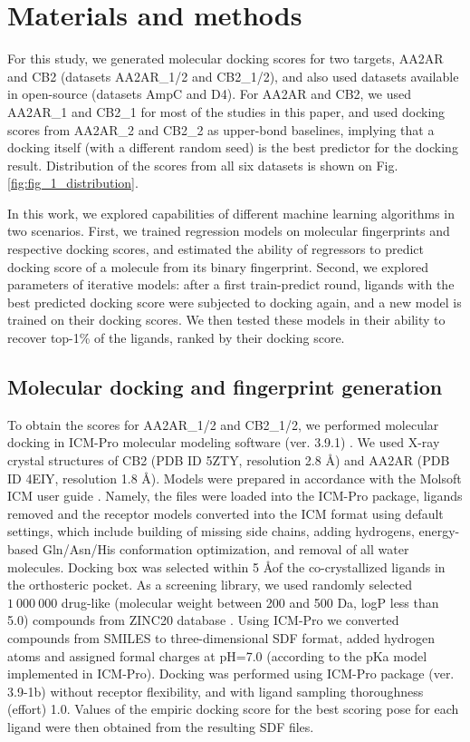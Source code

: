 \section{Materials and methods}
For this study, we generated molecular docking scores for two targets, AA2AR and CB2 (datasets AA2AR\_1/2 and CB2\_1/2), and also used datasets available in open-source \cite{ultralarge_docking_first} (datasets AmpC and D4). For AA2AR and CB2, we used AA2AR\_1 and CB2\_1 for most of the studies in this paper, and used docking scores from AA2AR\_2 and CB2\_2 as upper-bond baselines, implying that a docking itself (with a different random seed) is the best predictor for the docking result. Distribution of the scores from all six datasets is shown on Fig. \ref{fig:fig_1_distribution}.

In this work, we explored capabilities of different machine learning algorithms in two scenarios. First, we trained regression models on molecular fingerprints and respective docking scores, and estimated the ability of regressors to predict docking score of a molecule from its binary fingerprint. Second, we explored parameters of iterative models: after a first train-predict round, ligands with the best predicted docking score were subjected to docking again, and a new model is trained on their docking scores. We then tested these models in their ability to recover top-1\% of the ligands, ranked by their docking score.


\subsection{Molecular docking and fingerprint generation}
To obtain the scores for AA2AR\_1/2 and CB2\_1/2, we performed molecular docking in ICM-Pro molecular modeling software (ver. 3.9.1) \cite{molsoft_guide}. We used X-ray crystal structures of CB2 (PDB ID 5ZTY, resolution 2.8 \AA) and AA2AR (PDB ID 4EIY, resolution 1.8 \AA). Models were prepared in accordance with the Molsoft ICM user guide \cite{molsoft_guide}. Namely, the files were loaded into the ICM-Pro package, ligands removed and the receptor models converted into the ICM format using default settings, which include building of missing side chains, adding hydrogens, energy-based Gln/Asn/His conformation optimization, and removal of all water molecules. Docking box was selected within 5 \AA of the co-crystallized ligands in the orthosteric pocket. As a screening library, we used randomly selected $1\ 000\ 000$ drug-like (molecular weight between 200 and 500 Da, logP less than 5.0) compounds from ZINC20 database \cite{Irwin2020ZINC20Discovery}. Using ICM-Pro we converted compounds from SMILES to three-dimensional SDF  format, added hydrogen atoms and assigned formal charges at pH=7.0 (according to the pKa model implemented in ICM-Pro). Docking was performed using ICM-Pro package (ver. 3.9-1b) without receptor flexibility, and with ligand sampling thoroughness (effort) 1.0. Values of the empiric docking score for the best scoring pose for each ligand were then obtained from the resulting SDF files.

